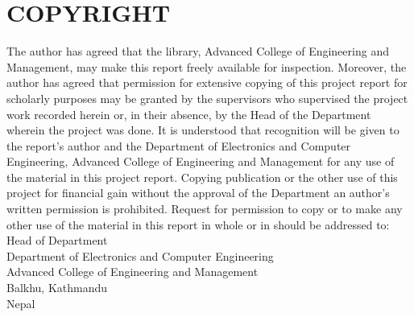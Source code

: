 \documentclass[../main.tex]{subfiles}
\begin{document}
    \section*{COPYRIGHT}
    The author has agreed that the library, Advanced College of Engineering and Management, 
may make this report freely available for inspection. Moreover, the author has agreed that 
permission for extensive copying of this project report for scholarly purposes may be 
granted by the supervisors who supervised the project work recorded herein or, in their 
absence, by the Head of the Department wherein the project was done. It is understood that 
recognition will be given to the report's author and the Department of Electronics and 
Computer Engineering, Advanced College of Engineering and Management for any use of 
the material in this project report. Copying publication or the other use of this project for 
financial gain without the approval of the Department an author’s written permission is 
prohibited.
\vspace{0.75cm}
\newline
Request for permission to copy or to make any other use of the material in this report in 
whole or in should be addressed to:
\vspace{0.75cm}
\newline
Head of Department \\
Department of Electronics and Computer Engineering\\
Advanced College of Engineering and Management\\
Balkhu, Kathmandu\\
Nepal
\end{document}
